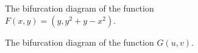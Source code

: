 \documentclass[12pt,a4paper]{amsart}
\numberwithin{equation}{section}
\numberwithin{lause}{section}
\begin{document}
\clearpage




\begin{figure}[h!]
\begin{center}
\caption{The bifurcation diagram of the function $F(x,y)=(y,y^{2}+y-x^{2})$.}
\label{kuva18}
\end{center}
\end{figure}


\begin{figure}[h!]
\begin{center}
\caption{The bifurcation diagram of the function $G(u,v)$.}
\label{kuva19}
\end{center}
\end{figure}
\end{document}
